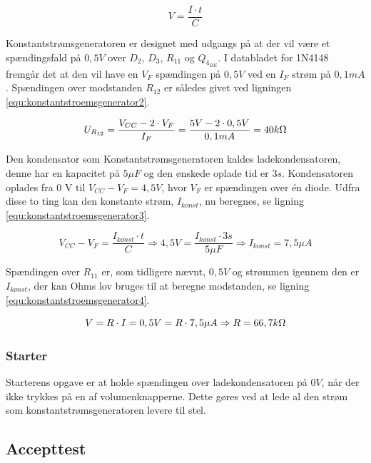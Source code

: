 \begin{equation}
\label{equ:konstantstroemsgenerator1}
V = \frac{I \cdot t}{C}
\end{equation}

Konstantstrømsgeneratoren er designet med udgangs på at der vil være et spændingsfald på $0,5 V$ over $D_2$, $D_3$, $R_{11}$ og $Q_{4_{BE}}$. I databladet for 1N4148 fremgår det at den vil have en $V_F$ spændingen på $0,5 V$ ved en $I_F$ strøm på $0,1 mA$. Spændingen over modstanden $R_{12}$ er således givet ved ligningen \ref{equ:konstantstroemsgenerator2}.

\begin{equation}
\label{equ:konstantstroemsgenerator2}
U_{R_{12}} = \frac{V_{CC} - 2 \cdot V_F}{I_F} = \frac{5V - 2 \cdot 0,5 V}{0,1 mA} = 40 k\ohm
\end{equation}

Den kondensator som Konstantstrømsgeneratoren kaldes ladekondensatoren, denne har en kapacitet på $5 \mu F$ og den ønskede oplade tid er $3 s$. Kondensatoren oplades fra 0 V til $V_{CC} - V_F = 4,5 V$, hvor $V_F$ er spændingen over én diode. Udfra disse to ting kan den konstante strøm, $I_{konst}$, nu beregnes, se ligning \ref{equ:konstantstroemsgenerator3}.

\begin{equation}
\label{equ:konstantstroemsgenerator3}
V_{CC} - V_F = \frac{I_{konst} \cdot t}{C} \Rightarrow 4,5 V = \frac{I_{konst} \cdot 3 s}{5 \mu F} \Rightarrow I_{konst} = 7,5 \mu A
\end{equation}

Spændingen over $R_{11}$ er, som tidligere nævnt, $0,5 V$ og strømmen igennem den er $I_{konst}$, der kan Ohms lov bruges til at beregne modstanden, se ligning \ref{equ:konstantstroemsgenerator4}.

\begin{equation}
\label{equ:konstantstroemsgenerator4}
V = R \cdot I = 0,5 V = R \cdot 7,5 \mu A \Rightarrow R = 66,7 k\ohm
\end{equation}

\subsubsection{Starter}
\label{volumenkontrol-simulering-starter}

Starterens opgave er at holde spændingen over ladekondensatoren på $0 V$, når der ikke trykkes på en af volumenknapperne. Dette gøres ved at lede al den strøm som konstantstrømsgeneratoren levere til stel.

\subsection{Accepttest}
\label{volumenkontrol-accepttest}